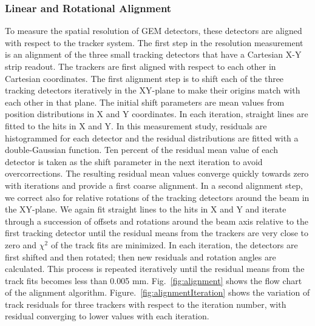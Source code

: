 \subsubsection{Linear and Rotational Alignment}
To measure the spatial resolution of GEM detectors, these detectors are aligned with respect to the tracker system.
The first step in the resolution measurement is an alignment of the three small tracking detectors that have a Cartesian X-Y strip readout.
The trackers are first aligned with respect to each other in Cartesian coordinates.
The first alignment step is to shift each of the three tracking detectors iteratively in the XY-plane to make their origins match with each other in that plane.
The initial shift parameters are mean values from position distributions in X and Y coordinates. In each iteration, straight lines are fitted to the hits in X and Y.
In this measurement study, residuals are histogrammed for each detector and the residual distributions are fitted with a double-Gaussian function.
Ten percent of the residual mean value of each detector is taken as the shift parameter in the next iteration to avoid overcorrections.
The resulting residual mean values converge quickly towards zero with iterations and provide a first coarse alignment.
In a second alignment step, we correct also for relative rotations of the tracking detectors around the beam in the XY-plane.
We again fit straight lines to the hits in X and Y and iterate through a succession of offsets and rotations around the beam axis relative to the first tracking detector until the residual means from the trackers are very close to zero and $\chi^2$ of the track fits are minimized.
In each iteration, the detectors are first shifted and then rotated; then new residuals and rotation angles are calculated.
This process is repeated iteratively until the residual means from the track fits becomes less than 0.005 mm. Fig.~\ref{fig:alignment} shows the flow chart of the alignment algorithm.
Figure.~\ref{fig:alignmentIteration} shows the variation of track residuals for three trackers with respect to the iteration number, with residual converging to lower values with each iteration.
